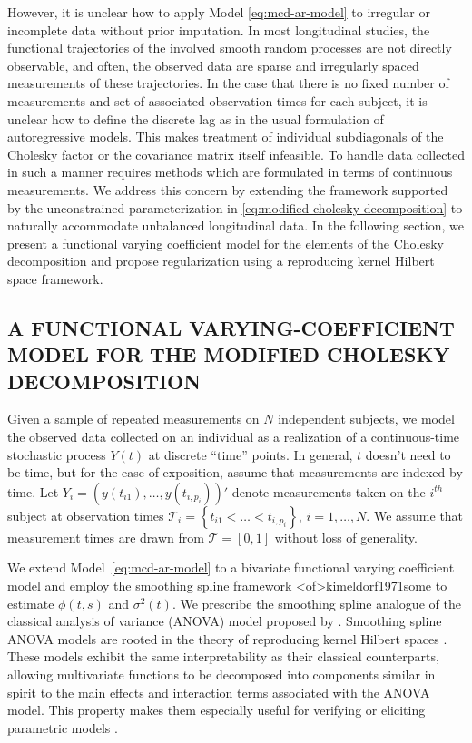 \documentclass[12pt]{article}
\begin{document}
However, it is unclear how to apply Model \eqref{eq:mcd-ar-model} to irregular or incomplete data without prior imputation. In most longitudinal studies, the functional trajectories of the involved smooth random processes are not directly observable, and often, the observed data are sparse and irregularly spaced measurements of these trajectories. In the case that there is no fixed number of measurements and set of associated observation times for each subject, it is unclear how to define the discrete lag as in the usual formulation of autoregressive models. This makes treatment of individual subdiagonals of the Cholesky factor or the covariance matrix itself infeasible. To handle data collected in such a manner requires methods which are formulated in terms of continuous measurements. We address this concern by extending the framework supported by the unconstrained parameterization in \eqref{eq:modified-cholesky-decomposition} to naturally accommodate unbalanced longitudinal data. In the following section, we present a functional varying coefficient model for the elements of the Cholesky decomposition and propose regularization using a reproducing kernel Hilbert space framework. 

\subsection*{\sffamily \large A FUNCTIONAL VARYING-COEFFICIENT MODEL FOR THE MODIFIED CHOLESKY DECOMPOSITION}

Given a sample of repeated measurements on $N$ independent subjects, we model the observed data collected on an individual as a realization of a continuous-time stochastic process $Y\left(t\right)$ at discrete ``time'' points. In general, $t$ doesn't need to be time, but for the ease of exposition, assume that measurements are indexed by time.  Let $Y_i = \left(y(t_{i1}), \dots, y(t_{i,p_i})\right)'$ denote measurements taken on the $i^{th}$ subject at observation times $\mathcal{T}_{i} = \left\{t_{i1} <  \dots < t_{i,p_i}\right\}$, $i = 1, \dots, N$. We assume that measurement times are drawn from $\mathcal{T} = \left[0,1\right]$ without loss of generality. 

We extend Model~\eqref{eq:mcd-ar-model} to a bivariate functional varying coefficient model and employ the smoothing spline framework \citeA<of>{kimeldorf1971some} to estimate $\phi(t,s)$ and $\sigma^2(t)$. We prescribe the smoothing spline analogue of the classical analysis of variance (ANOVA) model proposed by . Smoothing spline ANOVA models are rooted in the theory of reproducing kernel Hilbert spaces \cite{aronszajn1950theory,wahba1990spline,berlinet2011reproducing}. These models exhibit the same interpretability as their classical counterparts, allowing multivariate functions to be decomposed into components similar in spirit to the main effects and interaction terms associated with the ANOVA model. This property makes them especially useful for verifying or eliciting parametric models \cite{liu2004hypothesis}. 
 
\end{document}
